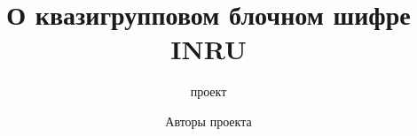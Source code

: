 
\title[Квазигрупповой шифр]{О квазигрупповом блочном шифре INRU}
\subtitle{проект}

\author{Авторы проекта}




